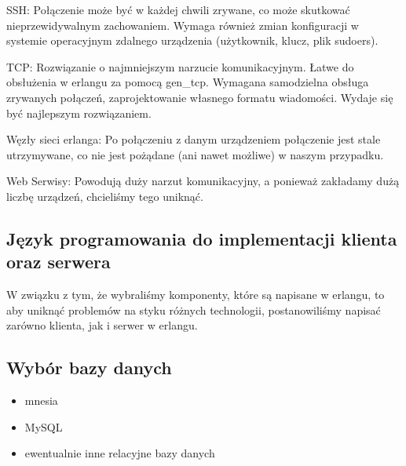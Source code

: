 \documentclass[polish,12pt]{aghthesis} \usepackage[utf8]{inputenc}
\begin{document}
SSH: Połączenie może być w każdej chwili zrywane, co może skutkować nieprzewidywalnym zachowaniem. Wymaga również zmian konfiguracji w systemie operacyjnym zdalnego urządzenia (użytkownik, klucz, plik sudoers).

TCP: Rozwiązanie o najmniejszym narzucie komunikacyjnym. Łatwe do obsłużenia w erlangu za pomocą gen\_tcp. Wymagana samodzielna obsługa zrywanych połączeń, zaprojektowanie własnego formatu wiadomości. Wydaje się być najlepszym rozwiązaniem.

Węzły sieci erlanga: Po połączeniu z danym urządzeniem połączenie jest stale utrzymywane, co nie jest pożądane (ani nawet możliwe) w naszym przypadku.

Web Serwisy: Powodują duży narzut komunikacyjny, a ponieważ zakładamy dużą liczbę urządzeń, chcieliśmy tego uniknąć.

\subsection{Język programowania do implementacji klienta oraz serwera}
W związku z tym, że wybraliśmy komponenty, które są napisane w erlangu, to aby uniknąć problemów na styku różnych technologii, postanowiliśmy napisać zarówno klienta, jak i serwer w erlangu.

\subsection {Wybór bazy danych}
\begin{itemize}
\item mnesia
\item MySQL
\item ewentualnie inne relacyjne bazy danych
\end{itemize}
\end{document}
